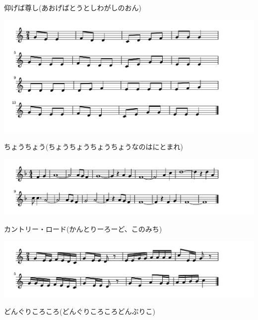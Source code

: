 \documentclass[a4paper]{ltjsarticle}
\begin{document}
\vspace{-10mm}

\parindent=50pt 
仰げば尊し(あおげばとうとしわがしのおん)
\parindent=10pt

\vspace{10mm}

\includegraphics[clip]{chouchou_crop.pdf}

\vspace{-10mm}

\parindent=50pt 
ちょうちょう(ちょうちょうちょうちょうなのはにとまれ)
\parindent=10pt

\vspace{10mm}

\includegraphics[clip]{countryroad_crop.pdf}

\vspace{-10mm}

\parindent=50pt 
カントリー・ロード(かんとりーろーど、このみち)
\parindent=10pt

\vspace{10mm}

\includegraphics[clip]{donguri_crop.pdf}

\vspace{-10mm}

\parindent=50pt 
どんぐりころころ(どんぐりころころどんぶりこ)
\parindent=10pt
\end{document}
